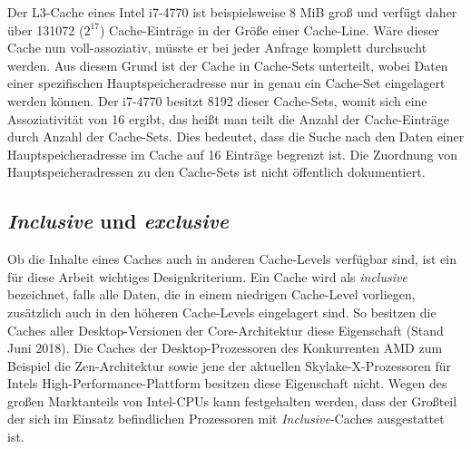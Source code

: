 Der L3-Cache eines Intel i7-4770 ist beispielsweise 8 MiB groß und verfügt daher über 131072 ($2^{17}$) Cache-Einträge in der Größe einer Cache-Line. 
Wäre dieser Cache nun voll-assoziativ, müsste er bei jeder Anfrage komplett durchsucht werden. Aus diesem Grund ist der Cache in Cache-Sets unterteilt, wobei Daten einer spezifischen Hauptspeicheradresse nur in genau ein Cache-Set eingelagert werden können. 
Der i7-4770 besitzt 8192 dieser Cache-Sets, womit sich eine Assoziativität von 16 ergibt, das heißt man teilt die Anzahl der Cache-Einträge durch Anzahl der Cache-Sets. Dies bedeutet, dass die Suche nach den Daten einer Hauptspeicheradresse im Cache auf 16 Einträge begrenzt ist. 
Die Zuordnung von Hauptspeicheradressen zu den Cache-Sets ist nicht öffentlich dokumentiert. 


\subsection{\textit{Inclusive} und \textit{exclusive}}
Ob die Inhalte eines Caches auch in anderen Cache-Levels verfügbar sind, ist ein für diese Arbeit wichtiges Designkriterium.  Ein Cache wird als \textit{inclusive} bezeichnet, falls alle Daten, die in einem niedrigen Cache-Level vorliegen, zusätzlich auch in den höheren Cache-Levels eingelagert sind. 
So besitzen die Caches aller Desktop-Versionen der Core-Architektur diese Eigenschaft (Stand Juni 2018). 
Die Caches der Desktop-Prozessoren des Konkurrenten AMD zum Beispiel die Zen-Architektur \cite{CacheRyzen} sowie jene der aktuellen Skylake-X-Prozessoren \cite{CacheSkylakeX} für Intels High-Performance-Plattform besitzen diese Eigenschaft nicht.
Wegen des großen Marktanteils von Intel-CPUs kann festgehalten werden, dass der Großteil der sich im Einsatz befindlichen Prozessoren mit \textit{Inclusive}-Caches ausgestattet ist.


